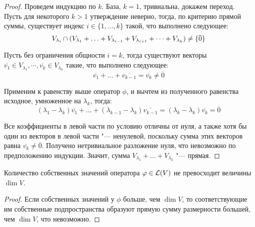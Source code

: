 \begin{proof}
	Проведем индукцию по $k$. База, $k = 1$, тривиальна, докажем переход. Пусть для некоторого $k > 1$ утверждение неверно, тогда, по критерию прямой суммы, существует индекс $i \in \{1, \dots, k\}$ такой, что выполнено следующее:
	\[ V_{\lambda_i} \cap (V_{\lambda_1} + \dots \hm{+} V_{\lambda_{i - 1}} + V_{\lambda_{i + 1}} + \dots + V_{\lambda_k}) \ne \{\overline{0}\}\]
	
	Пусть без ограничения общности $i = k$, тогда существуют векторы $\overline{v_1} \in V_{\lambda_1}, \cdots, \overline{v_k} \in V_{\lambda_k}$ такие, что выполнено следующее:
	\[\overline{v_1} + \dots + \overline{v_{k - 1}} = \overline{v_k} \ne \overline{0}\]
	
	Применим к равенству выше оператор $\phi$, и вычтем из полученного равенства исходное, умноженное на $\lambda_k$, тогда:
	\[(\lambda_1 - \lambda_k)\overline{v_1} + \dots + (\lambda_{k - 1} - \lambda_k)\overline{v_{k - 1}} = (\lambda_k - \lambda_k)\overline{v_k} = \overline{0}\]
	
	Все коэффициенты в левой части по условию отличны от нуля, а также хотя бы один из векторов в левой части "--- ненулевой, поскольку сумма этих векторов равна $\overline{v_k} \ne \overline{0}$. Получено нетривиальное разложение нуля, что невозможно по предположению индукции. Значит, сумма $V_{\lambda_1} + \dots + V_{\lambda_k}$ "--- прямая.
\end{proof}

\begin{corollary}
	Количество собственных значений оператора $\varphi \in \mathcal L (V)$ не превосходит величины $\dim{V}$.
\end{corollary}

\begin{proof}
	Если собственных значений у $\phi$ больше, чем $\dim{V}$, то соответствующие им собственные подпространства образуют прямую сумму размерности большей, чем $\dim{V}$, что невозможно.
\end{proof}


